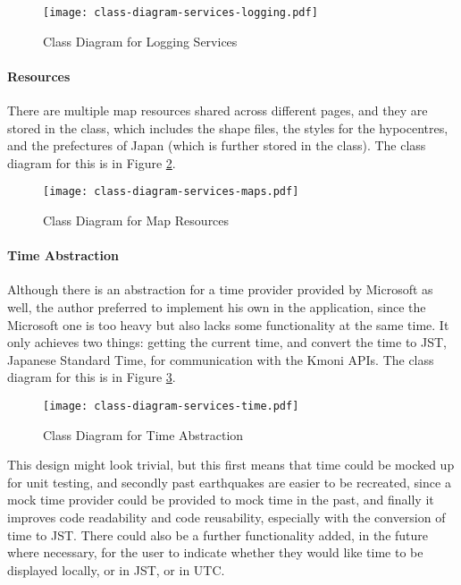 \begin{figure}[htp]
    \centering
    \texttt{[image: class-diagram-services-logging.pdf]}
    \caption{Class Diagram for Logging Services}
    \label{fig:class-diagram-services-logging}
\end{figure}

\paragraph{Resources}

There are multiple map resources shared across different pages, and they are stored in the  class, which includes the shape files, the styles for the hypocentres, and the prefectures of Japan (which is further stored in the  class).  The class diagram for this is in Figure \ref{fig:class-diagram-services-maps}.

\begin{figure}[htp]
    \centering
    \texttt{[image: class-diagram-services-maps.pdf]}
    \caption{Class Diagram for Map Resources}
    \label{fig:class-diagram-services-maps}
\end{figure}

\paragraph{Time Abstraction}

Although there is an abstraction for a time provider provided by Microsoft as well, the author preferred to implement his own in the application, since the Microsoft one is too heavy but also lacks some functionality at the same time. It only achieves two things: getting the current time, and convert the time to JST, Japanese Standard Time, for communication with the Kmoni APIs. The class diagram for this is in Figure \ref{fig:class-diagram-services-time}.

\begin{figure}[htp]
    \centering
    \texttt{[image: class-diagram-services-time.pdf]}
    \caption{Class Diagram for Time Abstraction}
    \label{fig:class-diagram-services-time}
\end{figure}

This design might look trivial, but this first means that time could be mocked up for unit testing, and secondly past earthquakes are easier to be recreated, since a mock time provider could be provided to mock time in the past, and finally it improves code readability and code reusability, especially with the conversion of time to JST. There could also be a further functionality added, in the future where necessary, for the user to indicate whether they would like time to be displayed locally, or in JST, or in UTC.

